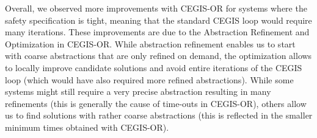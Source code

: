 \documentclass[sigconf]{llncs}
\renewcommand{\note}[1]{\textcolor{red}{[#1]}}
\begin{document}
Overall, we observed more improvements with CEGIS-OR for
systems where the safety specification is tight, 
meaning that the standard CEGIS loop would require many iterations.
These improvements are due to the Abstraction Refinement and Optimization in CEGIS-OR.
While abstraction refinement enables us to start with coarse abstractions
that are only refined on demand, 
the optimization
allows to locally improve candidate solutions and avoid entire iterations of the CEGIS loop
(which would have also required more refined abstractions).
While some systems might still require a very precise
abstraction resulting in many refinements
(this is generally the cause of time-outs in CEGIS-OR),
others allow us to find solutions with rather coarse
abstractions (this is reflected in the smaller minimum
times obtained with CEGIS-OR). 


\end{document}
